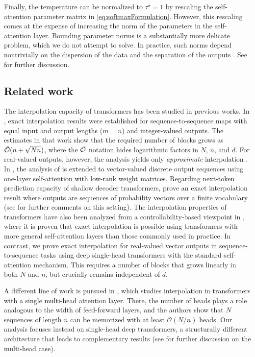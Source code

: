 \documentclass[pdflatex,sn-mathphys-num]{sn-jnl}%
\theoremstyle{thmstyleone}%
\theoremstyle{thmstyletwo}%
\theoremstyle{thmstylethree}%
\numberwithin{equation}{section}
\begin{document}
Finally, the temperature can be normalized to $\tau^\star = 1$ by rescaling the self-attention parameter matrix in \eqref{eq:softmaxFormulation}. However, this rescaling comes at the expense of increasing the norm of the parameters in the self-attention layer. Bounding parameter norms is a substantially more delicate problem, which we do not attempt to solve. In practice, such norms depend nontrivially on the dispersion of the data and the separation of the outputs \cite{kim2023provable}. See  for further discussion.

\subsection{Related work}\label{ss:relatedWork}

The interpolation capacity of transformers has been studied in previous works. In \cite{kim2023provable}, exact interpolation results were established for sequence-to-sequence maps with equal input and output lengths ($m = n$) and integer-valued outputs. The estimates in that work show that the required number of blocks grows as $\Tilde{\mathcal{O}}(n + \sqrt{Nn})$, where the $\Tilde{\mathcal{O}}$ notation hides logarithmic factors in $N$, $n$, and $d$. For real-valued outputs, however, the analysis yields only \emph{approximate} interpolation \cite[Remark~3.2]{kim2023provable}. In \cite{kajitsuka2024are}, the analysis of \cite{kim2023provable} is extended to vector-valued discrete output sequences using one-layer self-attention with low-rank weight matrices. Regarding next-token prediction capacity of shallow decoder transformers, \cite{madden2025next} prove an exact interpolation result where outputs are sequences of probability vectors over a finite vocabulary (see  for further comments on this setting). The interpolation properties of transformers have also been analyzed from a controllability-based viewpoint in \cite{agrachev2025generic}, where it is proven that exact interpolation is possible using transformers with more general self-attention layers than those commonly used in practice. In contrast, we prove exact interpolation for real-valued vector outputs in sequence-to-sequence tasks using deep single-head transformers with the standard self-attention mechanism. This requires a number of blocks that grows linearly in both $N$ and $n$, but crucially remains independent of $d$.

A different line of work is pursued in \cite{mahdavi2024memorization}, which studies interpolation in transformers with a single multi-head attention layer. There, the number of heads plays a role analogous to the width of feed-forward layers, and the authors show that $N$ sequences of length $n$ can be memorized with at least $\mathcal{O}(N/n)$ heads.
Our analysis focuses instead on single-head deep transformers, a structurally different architecture that leads to complementary results (see  for further discussion on the multi-head case).
\end{document}
